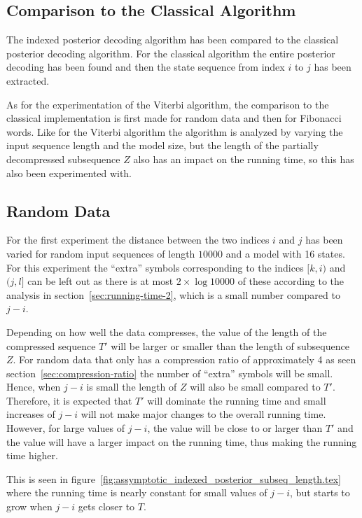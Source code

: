 \subsection{Comparison to the Classical Algorithm}

The indexed posterior decoding algorithm has been compared to the classical
posterior decoding algorithm. For the classical algorithm the entire posterior
decoding has been found and then the state sequence from index $i$ to $j$ has
been extracted.

As for the experimentation of the Viterbi algorithm, the comparison to the
classical implementation is first made for random data and then for Fibonacci
words. Like for the Viterbi algorithm the algorithm is analyzed by varying the
input sequence length and the model size, but the length of the partially
decompressed subsequence $Z$ also has an impact on the running time, so this
has also been experimented with.

\subsection{Random Data}

For the first experiment the distance between the two indices $i$ and $j$ has
been varied for random input sequences of length $10000$ and a model with 16
states. For this experiment the ``extra'' symbols corresponding to the indices
$[k, i)$ and $(j, l]$ can be left out as there is at most $2 \times \log 10000$
of these according to the analysis in section~\ref{sec:running-time-2}, which
is a small number compared to $j - i$.

Depending on how well the data compresses, the value of the length of the
compressed sequence $T'$ will be larger or smaller than the length of
subsequence $Z$. For random data that only has a compression ratio of
approximately 4 as seen section~\ref{sec:compression-ratio} the number of
``extra'' symbols will be small. Hence, when $j - i$ is small the length of $Z$
will also be small compared to $T'$. Therefore, it is expected that $T'$ will
dominate the running time and small increases of $j - i$ will not make major
changes to the overall running time. However, for large values of $j - i$, the
value will be close to or larger than $T'$ and the value will have a larger
impact on the running time, thus making the running time higher.

This is seen in
figure~\ref{fig:assymptotic_indexed_posterior_subseq_length.tex} where the
running time is nearly constant for small values of $j - i$, but starts to grow
when $j - i$ gets closer to $T$.

